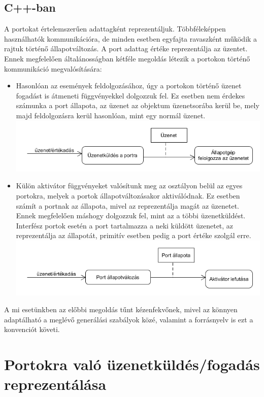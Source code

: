 \documentclass[a4paper,12pt]{report}
\begin{document}
\subsection{C++-ban} \label{cpp_gen_port}
A portokat értelemszerűen adattagként reprezentáljuk. Többféleképpen használhatók kommunikációra, de minden esetben egyfajta ravaszként működik a rajtuk történő állapotváltozás. A port adattag értéke reprezentálja az üzentet. Ennek megfelelően általánosságban kétféle megoldás létezik a portokon történő kommunikáció megvalósítására:
\begin{itemize}
\item Hasonlóan az események feldolgozásához, úgy a portokon történő üzenet fogadást is átmeneti függvényekkel dolgozzuk fel. Ez esetben nem érdekes számunka a port állapota, az üzenet az objektum üzenetsorába kerül be, mely majd feldolgozásra kerül hasonlóan, mint egy normál üzenet.  \\
\includegraphics[scale=0.6]{port_actfun.png}
\item Külön aktivátor függvényeket valósítunk meg az osztályon belül az egyes portokra, melyek a portok állapotváltozásakor aktiválódnak. Ez esetben számít a portnak az állapota, mivel az reprezentálja magát az üzenetet. Ennek megfelelően máshogy dolgozzuk fel, mint az a többi üzenetküldést. Interfész portok esetén a port tartalmazza a neki küldött üzenetet, az reprezentálja az állapotát, primitív esetben pedig a port értéke szolgál erre. \\
\includegraphics[scale=0.6]{port_sendm.png} \\
\end{itemize}

A mi esetünkben az előbbi megoldás tűnt kézenfekvőnek, mivel az könnyen adaptálható a meglévő generálási szabályok közé, valamint a forrásnyelv is ezt a konvenciót követi. 

\section{Portokra való üzenetküldés/fogadás reprezentálása} \label{message}
\end{document}
